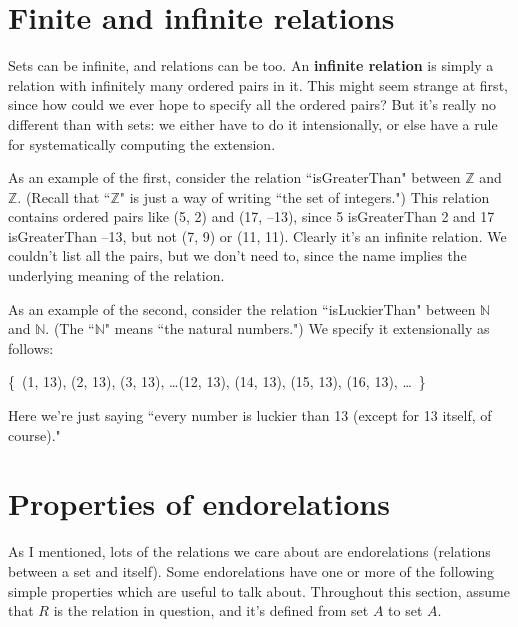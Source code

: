 \section{Finite and infinite relations}

Sets can be infinite, and relations can be too. An \textbf{infinite
relation} is simply a relation with infinitely many ordered pairs in it.
This might seem strange at first, since how could we ever hope to specify
all the ordered pairs? But it's really no different than with sets: we
either have to do it intensionally, or else have a rule for systematically
computing the extension.

As an example of the first, consider the relation ``isGreaterThan" between
$\mathbb{Z}$ and $\mathbb{Z}$. (Recall that ``$\mathbb{Z}$" is just a way
of writing ``the set of integers.") This relation contains ordered pairs
like (5, 2) and (17, --13), since 5 isGreaterThan 2 and 17 isGreaterThan
--13, but not (7, 9) or (11, 11). Clearly it's an infinite relation. We
couldn't list all the pairs, but we don't need to, since the name implies
the underlying meaning of the relation.

As an example of the second, consider the relation ``isLuckierThan" between
$\mathbb{N}$ and $\mathbb{N}$. (The ``$\mathbb{N}$" means ``the natural
numbers.") We specify it extensionally as follows:

\begin{center}
\small
\{~(1, 13), (2, 13), (3, 13), \dots (12, 13), (14, 13), (15, 13),
(16, 13), \dots~\}
\normalsize
\end{center}

Here we're just saying ``every number is luckier than 13 (except for 13
itself, of course)."


\section{Properties of endorelations}

As I mentioned, lots of the relations we care about are endorelations
(relations between a set and itself). Some endorelations have one or more
of the following simple properties which are useful to talk about.
Throughout this section, assume that $R$ is the relation in question, and
it's defined from set $A$ to set $A$.

